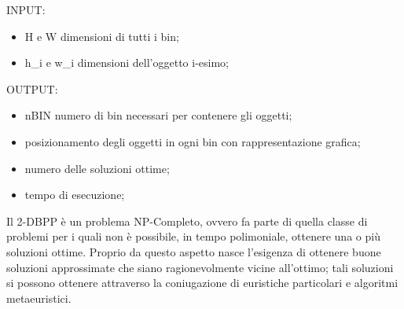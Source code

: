 INPUT:
\begin{itemize}
  \item H e W dimensioni di tutti i bin;
  \item h_{i} e w_{i} dimensioni dell’oggetto i-esimo;
\end{itemize}

OUTPUT:
\begin{itemize}
 \item nBIN numero di bin necessari per contenere gli oggetti;
 \item posizionamento degli oggetti in ogni bin con rappresentazione grafica;
 \item numero delle soluzioni ottime;
 \item tempo di esecuzione;
\end{itemize}

Il 2-DBPP è un problema NP-Completo, ovvero fa parte di quella classe di
problemi per i quali non è possibile, in tempo polimoniale, ottenere una o più
soluzioni ottime.
Proprio da questo aspetto nasce l'esigenza di ottenere buone soluzioni
approssimate che siano ragionevolmente vicine all'ottimo; tali soluzioni si
possono ottenere attraverso la coniugazione di euristiche particolari e
algoritmi metaeuristici. 
